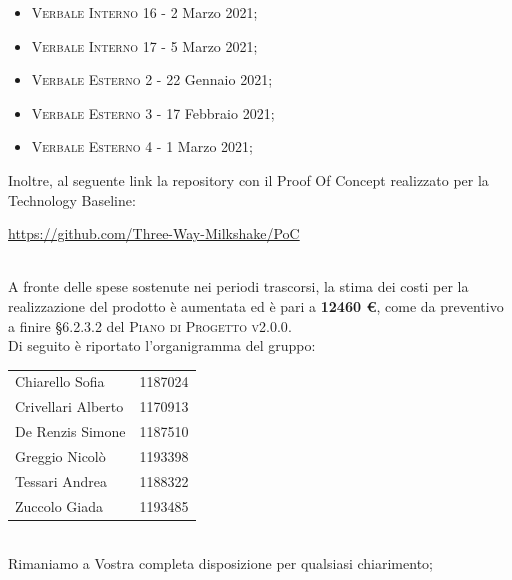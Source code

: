 \documentclass[10pt,stdletter,dateno,sigright]{newlfm}  %
\begin{document}
\begin{newlfm}
\begin{multicols}{2}
\begin{itemize}
            \item \textsc{Verbale Interno 16} - 2 Marzo 2021;
            \item \textsc{Verbale Interno 17} - 5 Marzo 2021;
            \item \textsc{Verbale Esterno 2} - 22 Gennaio 2021;
            \item \textsc{Verbale Esterno 3} - 17 Febbraio 2021;
            \item \textsc{Verbale Esterno 4} - 1 Marzo 2021;
        \end{itemize}
    \end{multicols}



        Inoltre, al seguente link la repository con il Proof Of Concept realizzato per la Technology Baseline:
        \begin{center}
        	\url{https://github.com/Three-Way-Milkshake/PoC}
        \end{center}
        \ \\
        A fronte delle spese sostenute nei periodi trascorsi, la stima dei costi per la realizzazione del prodotto è aumentata ed è pari a \textbf{12460 \euro}, come da preventivo a finire \S 6.2.3.2 del \textsc{Piano di Progetto v2.0.0}.
        \\

        Di seguito \`e riportato l'organigramma del gruppo:
        \begin{center}
            \begin{tabular}{l | l}
                Chiarello Sofia & 1187024
                \\
                Crivellari Alberto & 1170913
                \\
                De Renzis Simone & 1187510
                \\
                Greggio Nicolò & 1193398
                \\
                Tessari Andrea & 1188322
                \\
                Zuccolo Giada & 1193485
                \\
            \end{tabular}
        \end{center}
        \ \newline
        \\Rimaniamo a Vostra completa disposizione per qualsiasi chiarimento;

    \end{newlfm}
\end{document}
